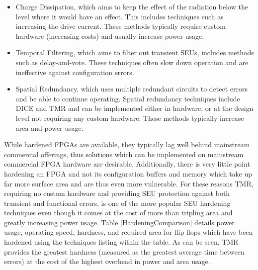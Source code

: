 \documentclass[12pt,final,oneside]{dwThesis} %
\begin{document}
   \begin{itemize}

      \item Charge Dissipation, which aims to keep the effect of the radiation
         below the level where it would have an effect. This includes
         techniques such as increasing the drive current. These methods
         typically require custom hardware (increasing costs) and usually
         increase power usage.
      \item Temporal Filtering, which aims to filter out transient \glspl{SEU},
         includes methods such as delay-and-vote\cite{HardeningTechniques}.
         These techniques often slow down operation and are ineffective
         against configuration errors.
      \item Spatial Redundancy, which uses multiple redundant circuits to
         detect errors and be able to continue operating. Spatial redundancy
         techniques include \gls{DICE}\cite{DICE} and \gls{TMR} and can be
         implemented either in hardware, or at the design level not
         requiring any custom hardware. These methods typically increase
         area and power usage.  
   \end{itemize}
   While hardened \glspl{FPGA}
   are available, they typically lag well behind mainstream commercial
   offerings\cite{VFPGATMR}, thus solutions which can be implemented on
   mainstream commercial \gls{FPGA} hardware are desirable. Additionally,
   there is very little point hardening an \gls{FPGA} and not its
   configuration buffers and memory which take up far more surface
   area\cite{FPGAArch} and are thus even more vulnerable.  For these reasons
   \gls{TMR}, requiring no custom hardware and providing \gls{SEU}
   protection against both transient and functional errors, is one of the
   more popular \gls{SEU} hardening techniques even though it comes at the
   cost of more than tripling area and greatly increasing power usage.
   Table \ref{HardeningComparison} details power usage, operating speed,
   hardness, and required area for flip flops which have been hardened using
   the techniques listing within the table. As can be seen, \gls{TMR} provides the greatest hardness
   (measured as the greatest average time between errors) at the cost of the highest overhead in power and area usage.
\end{document}
